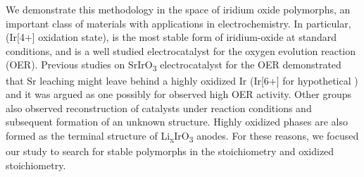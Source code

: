 We demonstrate this methodology in the space of iridium oxide polymorphs,
an important class of materials with applications in electrochemistry.
%
In particular, \rIrOtwo (Ir[4+] oxidation state), is the most stable form of iridium-oxide at standard conditions,
and is a well studied electrocatalyst for the oxygen evolution reaction (OER).
\cite{Seitz2016,Lee2012a,McCrory2015,Trotochaud2012,Danilovic2014,Carmo2013,Miles1978,Beni1979}
%
Previous studies on SrIrO\textsubscript{3} electrocatalyst for the OER demonstrated that Sr leaching might leave behind a highly oxidized Ir (Ir[6+] for hypothetical \IrOthree) and it was argued as one possibly for observed high OER activity.\cite{Seitz2016}
%
Other groups also observed reconstruction of \IrOx catalysts under reaction conditions and subsequent formation of an unknown structure. \cite{Pearce2017}
%
Highly oxidized \IrOthree phases are also formed as the terminal structure of Li\textsubscript{x}IrO\textsubscript{3} anodes.\cite{Pearce2017}
%
For these reasons, we focused our study to search for stable polymorphs in the \IrOtwo stoichiometry and  oxidized \IrOthree stoichiometry.
%
%




